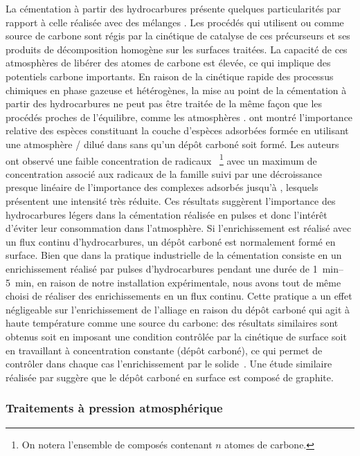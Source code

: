 La cémentation à partir des hydrocarbures présente quelques particularités par rapport à celle réalisée avec des mélanges . Les procédés qui utilisent  ou  comme source de carbone sont régis par la cinétique de catalyse de ces précurseurs et ses produits de décomposition homogène sur les surfaces traitées. La capacité de ces atmosphères de libérer des atomes de carbone est élevée, ce qui implique des potentiels carbone importants. En raison de la cinétique rapide des processus chimiques en phase gazeuse et hétérogènes, la mise au point de la cémentation à partir des hydrocarbures ne peut pas être traitée de la même façon que les procédés proches de l'équilibre, comme les atmosphères . \citet{Kula2005} ont montré l'importance relative des espèces constituant la couche d'espèces adsorbées formée en utilisant une atmosphère / dilué dans  sans qu'un dépôt carboné soit formé. Les auteurs~\cite{Kula2005} ont observé une faible concentration de radicaux ~\footnote{On notera  l'ensemble de composés contenant $n$ atomes de carbone.} avec un maximum de concentration associé aux radicaux de la famille  suivi par une décroissance presque linéaire de l'importance des complexes adsorbés jusqu'à , lesquels présentent une intensité très réduite. Ces résultats suggèrent l'importance des hydrocarbures légers dans la cémentation réalisée en pulses et donc l'intérêt d'éviter leur consommation dans l'atmosphère. Si l'enrichissement est réalisé avec un flux continu d'hydrocarbures, un dépôt carboné est normalement formé en surface. 
Bien que dans la pratique industrielle de la cémentation consiste en un enrichissement réalisé par pulses d'hydrocarbures pendant une durée de \SIrange{1}{5}{\minute}, en raison de notre installation expérimentale, nous avons tout de même choisi de réaliser des enrichissements en un flux continu. Cette pratique a un effet négligeable sur l'enrichissement de l'alliage en raison du dépôt carboné qui agit à haute température comme une source du carbone: des résultats similaires sont obtenus soit en imposant une condition contrôlée par la cinétique de surface soit en travaillant à concentration constante (dépôt carboné), ce qui permet de contrôler dans chaque cas l'enrichissement par le solide~\cite{Kula2005}. Une étude similaire réalisée par \citet{Gorockiewicz2010429} suggère que le dépôt carboné en surface est composé de graphite.

\subsubsection{Traitements à pression atmosphérique}

